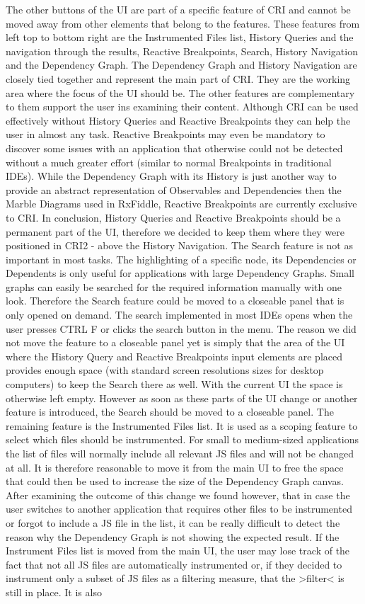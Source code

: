 The other buttons of the UI are part of a specific feature of CRI and cannot be moved away from other elements that belong to the features. These features from left top to bottom right are the Instrumented Files list, History Queries and the navigation through the results, Reactive Breakpoints, Search, History Navigation and the Dependency Graph. The Dependency Graph and History Navigation are closely tied together and represent the main part of CRI. They are the working area where the focus of the UI should be. The other features are complementary to them support the user ins examining their content. Although CRI can be used effectively without History Queries and Reactive Breakpoints they can help the user in almost any task. Reactive Breakpoints may even be mandatory to discover some issues with an application that otherwise could not be detected without a much greater effort (similar to normal Breakpoints in traditional IDEs). While the Dependency Graph with its History is just another way to provide an abstract representation of Observables and Dependencies then the Marble Diagrams used in RxFiddle, Reactive Breakpoints are currently exclusive to CRI. In conclusion, History Queries and Reactive Breakpoints should be a permanent part of the UI, therefore we decided to keep them where they were positioned in CRI2 - above the History Navigation. The Search feature is not as important in most tasks. The highlighting of a specific node, its Dependencies or Dependents is only useful for applications with large Dependency Graphs. Small graphs can easily be searched for the required information manually with one look. Therefore the Search feature could be moved to a closeable panel that is only opened on demand. The search implemented in most IDEs opens when the user presses CTRL F or clicks the search button in the menu. The reason we did not move the feature to a closeable panel yet is simply that the area of the UI where the History Query and Reactive Breakpoints input elements are placed provides enough space (with standard screen resolutions sizes for desktop computers) to keep the Search there as well. With the current UI the space is otherwise left empty. However as soon as these parts of the UI change or another feature is introduced, the Search should be moved to a closeable panel. The remaining feature is the Instrumented Files list. It is used as a scoping feature to select which files should be instrumented. For small to medium-sized applications the list of files will normally include all relevant JS files and will not be changed at all. It is therefore reasonable to move it from the main UI to free the space that could then be used to increase the size of the Dependency Graph canvas. After examining the outcome of this change we found however, that in case the user switches to another application that requires other files to be instrumented or forgot to include a JS file in the list, it can be really difficult to detect the reason why the Dependency Graph is not showing the expected result. If the Instrument Files list is moved from the main UI, the user may lose track of the fact that not all JS files are automatically instrumented or, if they decided to instrument only a subset of JS files as a filtering measure, that the >filter< is still in place. It is also 